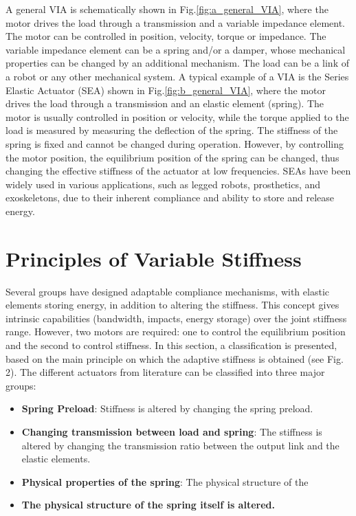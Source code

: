 \documentclass[12pt,a4paper]{article}
\begin{document}
    A general VIA is schematically shown in Fig.\ref{fig:a_general_VIA}, where the motor drives the load through a transmission and a variable impedance element. The motor can be controlled in position, velocity, torque or impedance. The variable impedance element can be a spring and/or a damper, whose mechanical properties can be changed by an additional mechanism. The load can be a link of a robot or any other mechanical system. A typical example of a VIA is the Series Elastic Actuator (SEA) shown in Fig.\ref{fig:b_general_VIA}, where the motor drives the load through a transmission and an elastic element (spring). The motor is usually controlled in position or velocity, while the torque applied to the load is measured by measuring the deflection of the spring. The stiffness of the spring is fixed and cannot be changed during operation. However, by controlling the motor position, the equilibrium position of the spring can be changed, thus changing the effective stiffness of the actuator at low frequencies. SEAs have been widely used in various applications, such as legged robots, prosthetics, and exoskeletons, due to their inherent compliance and ability to store and release energy.

    \section{Principles of Variable Stiffness}
    Several groups have designed adaptable compliance mechanisms, with
    elastic elements storing energy, in addition to altering the stiffness. This
    concept gives intrinsic capabilities (bandwidth, impacts, energy storage) over
    the joint stiffness range. However, two motors are required: one to control
    the equilibrium position and the second to control stiffness. In this section, a
    classification is presented, based on the main principle on which the adaptive
    stiffness is obtained (see Fig. 2). The different actuators from literature can
    be classified into three major groups:
    \begin{itemize}
        \item \textbf{Spring Preload}: Stiffness is altered by changing the spring preload.
        \item \textbf{Changing transmission between load and spring}: The stiffness 
        is altered by changing the transmission ratio between the output link
        and the elastic elements.
        \item \textbf{Physical properties of the spring}: The physical structure of the
        \item \bfseries The physical structure of the
        spring itself is altered.
    \end{itemize}
\end{document}
